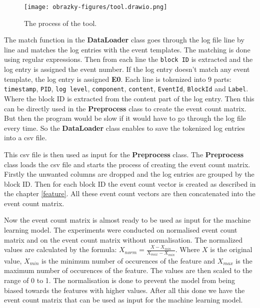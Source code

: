 \begin{figure}
    \centering
    \texttt{[image: obrazky-figures/tool.drawio.png]}
    \caption{The process of the tool.}
    \label{fig:tool}
\end{figure}

The match function in the \textbf{DataLoader} class goes through the log file line by line and matches the log entries with the event templates. The matching is done using regular expressions.
Then from each line the \texttt{block ID} is extracted and the log entry is assigned the event number. If the log entry doesn't match any event template, the log entry is assigned \textbf{E0}.
Each line is tokenized into 9 parts: \texttt{timestamp}, \texttt{PID}, \texttt{log level}, \texttt{component}, \texttt{content}, \texttt{EventId}, \texttt{BlockId} and \texttt{Label}. 
Where the block ID is extracted from the content part of the log entry. Then this can be directly used in the \textbf{Preprocess} class to create the event count matrix. But then the program would 
be slow if it would have to go through the log file every time. So the \textbf{DataLoader} class enables to save the tokenized log entries into a csv file.

This csv file is then used as input for the \textbf{Preprocess} class. The \textbf{Preprocess} class loads the csv file and starts the process of creating the event count matrix. 
Firstly the unwanted columns are dropped and the log entries are grouped by the block ID. 
Then for each block ID the event count vector is created as described in the chapter \ref{feature}. All these event count vectors are then concatenated into the event count matrix. 

Now the event count matrix is almost ready to be used as input for the machine learning model. The experiments were conducted on normalised event count matrix and on the event count matrix without normalisation.
The normalized values are calculated by the formula: $X_{norm} = \frac{X - X_{min}}{X_{max} - X_{min}}$. Where $X$ is the original value, $X_{min}$ is the minimum number of occurences of the feature and $X_{max}$ is the maximum number of occurences of the feature.
The values are then scaled to the range of 0 to 1. The normalisation is done to prevent the model from being biased towards the features with higher values.
After all this done we have the event count matrix that can be used as input for the machine learning model.

